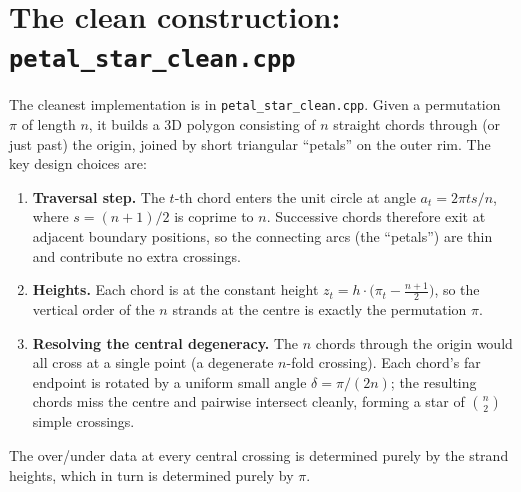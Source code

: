 \documentclass[11pt,oneside]{report}
\theoremstyle{definition}
\begin{document}
\section{The clean construction: \texttt{petal\_star\_clean.cpp}}

The cleanest implementation is in \texttt{petal\_star\_clean.cpp}. Given a
permutation $\pi$ of length $n$, it builds a 3D polygon consisting of $n$
straight chords through (or just past) the origin, joined by short triangular
``petals'' on the outer rim. The key design choices are:

\begin{enumerate}[leftmargin=2em]
\item \textbf{Traversal step.} The $t$-th chord enters the unit circle at
angle $a_t = 2\pi t s / n$, where $s = (n+1)/2$ is coprime to $n$. Successive
chords therefore exit at adjacent boundary positions, so the connecting
arcs (the ``petals'') are thin and contribute no extra crossings.
\item \textbf{Heights.} Each chord is at the constant height
$z_t = h \cdot \bigl(\pi_t - \tfrac{n+1}{2}\bigr)$, so the vertical order of
the $n$ strands at the centre is exactly the permutation $\pi$.
\item \textbf{Resolving the central degeneracy.} The $n$ chords through the
origin would all cross at a single point (a degenerate $n$-fold crossing).
Each chord's far endpoint is rotated by a uniform small angle
$\delta = \pi/(2n)$; the resulting chords miss the centre and pairwise
intersect cleanly, forming a star of $\binom{n}{2}$ simple crossings.
\end{enumerate}

The over/under data at every central crossing is determined purely by the
strand heights, which in turn is determined purely by $\pi$.
\end{document}
